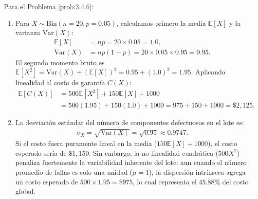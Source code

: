 \begin{solucion}
	\label{sol:3.4.6}
	Para el Problema \ref{prob:3.4.6}:
	\begin{enumerate}
		\item Para $X \sim \text{Bin}(n=20, p=0.05)$, calculamos primero la media $\mathbb{E}[X]$ y la varianza $\text{Var}(X)$:
		\begin{align*}
			\mathbb{E}[X] &= np = 20 \times 0.05 = 1.0, \\
			\text{Var}(X) &= np(1-p) = 20 \times 0.05 \times 0.95 = 0.95.
		\end{align*}
		El segundo momento bruto es $\mathbb{E}[X^2] = \text{Var}(X) + (\mathbb{E}[X])^2 = 0.95 + (1.0)^2 = 1.95$. Aplicando linealidad al costo de garantía $C(X)$:
		\begin{align*}
			\mathbb{E}[C(X)] &= 500 \mathbb{E}[X^2] + 150 \mathbb{E}[X] + 1000 \\
			&= 500(1.95) + 150(1.0) + 1000 = 975 + 150 + 1000 = \$2,125.
		\end{align*}
		\item La desviación estándar del número de componentes defectuosos en el lote es:
		\begin{align*}
			\sigma_X = \sqrt{\text{Var}(X)} = \sqrt{0.95} \approx 0.9747.
		\end{align*}
		Si el costo fuera puramente lineal en la media ($150 \mathbb{E}[X] + 1000$), el costo esperado sería de $\$1,150$. Sin embargo, la no linealidad cuadrática ($500 X^2$) penaliza fuertemente la variabilidad inherente del lote: aun cuando el número promedio de fallas es solo una unidad ($\mu=1$), la dispersión intrínseca agrega un costo esperado de $500 \times 1.95 = \$975$, lo cual representa el $45.88\%$ del costo global.
	\end{enumerate}
\end{solucion}

